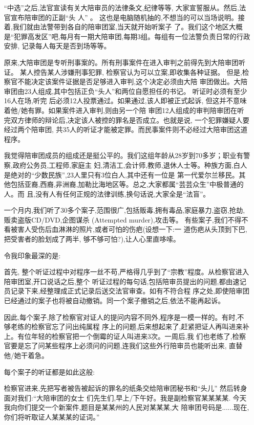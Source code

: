 ﻿\documentclass[10pt]{article}
\begin{document}
{``中选''之后,法官宣读有关大陪审员的法律条文,纪律等等, 大家宣誓服从。然后,法官宣布陪审团的正副``头
人'' 。 这也是电脑随机抽的,不想当的可以当场说明。接着,我们就由法警带到各自的陪审团室,当天就开始听案子
了。我们这个地区大概是``犯罪高发区''吧,每月有一期大陪审团,每期3组。每组有一位法警负责日常的行政安排,
记录每人每天是否到场等等。

原来,大陪审团是专听刑事案的。所有刑事案件在进入审判之前得先到大陪审团听证。 某人控告某人涉嫌刑事犯罪,
检察官认为可以立案,即收集各种证据。 但是,检察官不能决定该案件证据是否足够进入审判,这个决定必须由大陪
审团做出。大陪审团由23人组成,其中包括正负``头人''和两位自愿担任的书记。 听证时必须有至少16人在场,听完
后必须12人投票通过。如果通过,该人即被正式起诉, 但这并不意味着他/她有罪。如果案件进入审判,则由另一个陪
审团\myrule 12人组成的审判陪审团\myrule 在听完双方律师的辩论后,决定该人被控的罪名是否成立。也就是说,
一个犯罪嫌疑人要经过两个陪审团, 共35人的听证才能被定罪。而民事案件则不必经过大陪审团这道程序。

我觉得陪审团成员的组成还是挺公平的。我们这组年龄从28岁到70多岁；职业有警察,政府公务员,工程师,家庭主
妇,清洁工,会计师,教师,退休人士等。种族方面,白人是绝对的``少数民族'',23人里只有3位白人,其中还有一位是
第一代爱尔兰移民。其他包括亚裔,西裔,非洲裔,加勒比海地区等。总之,大家都属``芸芸众生''中极普通的人。而
且,没有人有任何正规的法律训练,换句话说,大家全是``法盲''。

一个月内,我们听了30多个案子,范围很广,包括贩毒,拥有毒品,家庭暴力,盗窃,抢劫,贩卖盗版CD/DVD,企图谋杀
(Attempted murder),攻击等。 有些案子,我们不得不看被害人受伤后血淋淋的照片,或者可怕的伤疤(设想一下:一
道伤疤从头顶到下巴, 把受害者的脸划成了两半, 够不够可怕?),让人心里直哆嗦。

令我印象最深的是:

首先, 整个听证过程中对程序一丝不苟,严格得几乎到了``宗教''程度。从检察官进入陪审团室,开口说话之后,整个
听证过程的每句话,包括陪审员提出的问题,都由速记员记录下来,经整理成正式记录后送交法官审查。如有不符合程
序之处,即使陪审团已经通过的案子也将被自动撤销。同一个案子撤销之后,依法不能再起诉。

因此,每个案子,除了检察官对证人的提问内容不同外,程序是一模一样的。有时,不够老练的检察官忘了问出纯属程
序上的问题,后来想起来了,赶紧把证人再叫进来补上。有位年轻的检察官把一个倒霉的证人叫进来3次。一周后,我
们也老练了,检察官要是忘了问某些程序上必须问的问题,连我们这些外行陪审员也能听出来, 直替他/她干着急。

每个案子的听证都是如此这般:

检察官进来,先把写者被告被起诉的罪名的纸条交给陪审团秘书和``头儿'' 然后转身 面对我们:``大陪审团的女士
们先生们,早上/下午好。我是副检察官某某某某. 今天我向你们提交一个新案件,题目是某某州的人民对某某某,大
陪审团号码是......现在,你们将听取证人某某某的证词。''

}
\end{document}
